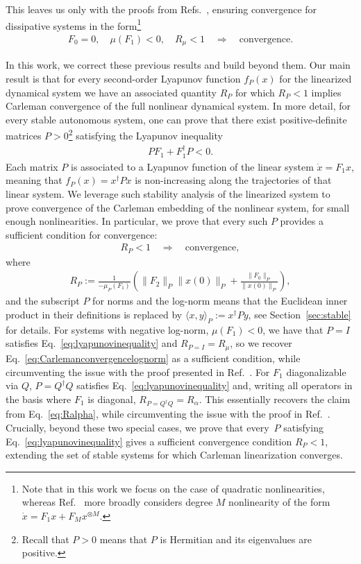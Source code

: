 \documentclass[superscriptaddress,onecolumn,nofootinbib,longbibliography,a4paper,accepted=2026-09-29]{quantumarticle}
\theoremstyle{plain}
\theoremstyle{definition}
\numberwithin{thm}{section}
\numberwithin{assumption}{section}
\numberwithin{lemma}{section}
\numberwithin{prop}{section}
\numberwithin{cor}{section}
\numberwithin{definition}{section}
\numberwithin{rmk}{section}
\numberwithin{equation}{section}
\begin{document}
This leaves us only with the proofs from Refs.~\cite{forets2017explicit, costa2023further}, ensuring convergence for dissipative systems in the form\footnote{Note that in this work we focus on the case of quadratic nonlinearities, whereas Ref.~\cite{costa2023further} more broadly considers degree $M$ nonlinearity of the form $\dot{x} = F_1 x + F_M x^{\otimes M}$.}
 \begin{align}
    \label{eq:convergence_lognorm_noF0}
     F_0 =0,\quad \mu(F_1) <0,\quad R_\mu < 1 \quad\Rightarrow\quad \textrm{convergence}.
 \end{align}

In this work, we correct these previous results and build beyond them. Our main result is that for every second-order Lyapunov function $f_P(x)$ for the linearized dynamical system we have an associated quantity $R_P$ for which $R_P <1$ implies Carleman convergence of the full nonlinear dynamical system. In more detail, for every stable autonomous system, one can prove that there exist positive-definite matrices $P>0$\footnote{Recall that $P>0$ means that $P$ is Hermitian and its eigenvalues are positive.} satisfying the Lyapunov inequality~\cite{plischke2005transient}
 \begin{align}
\label{eq:lyapunovinequality}
    P F_1 + F_1^\dag P < 0.
\end{align}
Each matrix $P$ is associated to a Lyapunov function of the linear system $\dot{x} = F_1 x$, meaning that $f_P(x) = x^\dag P x$ is non-increasing along the trajectories of that linear system. We leverage such stability analysis of the linearized system to prove convergence of the Carleman embedding of the nonlinear system, for small enough nonlinearities. In particular, we prove that every such $P$ provides a sufficient condition for convergence:
 \begin{align}
    R_P < 1\quad\Rightarrow\quad \textrm{convergence},
 \end{align}
where
\begin{align}
\label{eq:RPfirst}
     R_P :=  \frac{1}{-\mu_P(F_{1})} \left (  \|F_{2}\|_P \|x(0)\|_P + \frac{\|F_0\|_P}{ \|x(0)\|_P} \right ),
\end{align}
and the subscript $P$ for norms and the log-norm means that the Euclidean inner product in their definitions is replaced by $\langle x, y \rangle_P := x^\dag P y$, see Section~\ref{sec:stable} for details. For systems with negative log-norm, $\mu(F_1)<0$, we have that $P=I$ satisfies Eq.~\eqref{eq:lyapunovinequality} and $R_{P=I} = R_\mu$, so we recover Eq.~\eqref{eq:Carlemanconvergencelognorm} as a sufficient condition, while circumventing the issue with the proof presented in Ref.~\cite{krovi2023improved}. For $F_1$ diagonalizable via $Q$, $P= Q^\dag Q$ satisfies Eq.~\eqref{eq:lyapunovinequality} and, writing all operators in the basis where $F_1$ is diagonal, $R_{P= Q^\dag Q} = R_\alpha$. This essentially recovers the claim from Eq.~\eqref{eq:Ralpha}, while circumventing the issue with the proof in Ref.~\cite{liu2021efficient}. Crucially, beyond these two special cases, we prove that every~$P$ satisfying Eq.~\eqref{eq:lyapunovinequality} gives a sufficient convergence condition $R_P<1$, extending the set of stable systems for which Carleman linearization converges.
\end{document}
